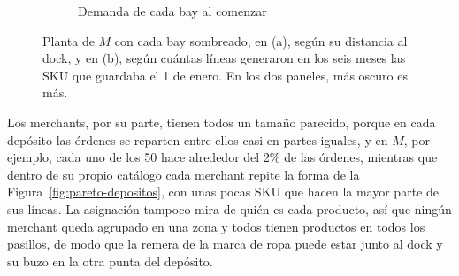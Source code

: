 \begin{figure}[ht]
\begin{subfigure}{0.48\textwidth}
        \caption{Demanda de cada bay al comenzar}
        \label{fig:plano-demanda}
    \end{subfigure}
    \caption{Planta de $M$ con cada bay sombreado, en (a), según su distancia al dock, y en (b), según cuántas líneas generaron en los seis meses las SKU que guardaba el 1 de enero. En los dos paneles, más oscuro es más.}
    \label{fig:plano-asignacion}
\end{figure}

Los merchants, por su parte, tienen todos un tamaño parecido, porque en cada depósito las órdenes se reparten entre ellos casi en partes iguales, y en $M$, por ejemplo, cada uno de los 50 hace alrededor del 2\% de las órdenes, mientras que dentro de su propio catálogo cada merchant repite la forma de la Figura~\ref{fig:pareto-depositos}, con unas pocas SKU que hacen la mayor parte de sus líneas.
La asignación tampoco mira de quién es cada producto, así que ningún merchant queda agrupado en una zona y todos tienen productos en todos los pasillos, de modo que la remera de la marca de ropa puede estar junto al dock y su buzo en la otra punta del depósito.


